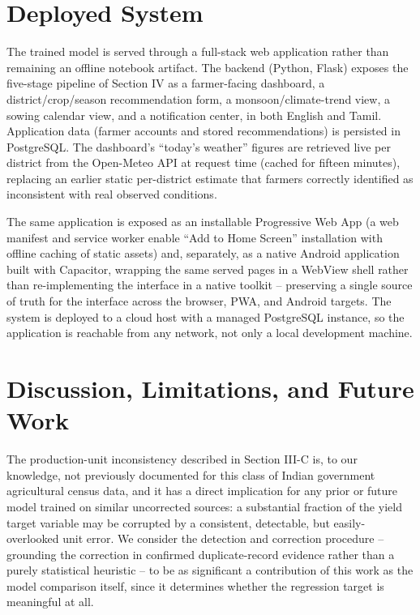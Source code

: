 \documentclass[conference]{IEEEtran}
\begin{document}
\section{Deployed System}

The trained model is served through a full-stack web application rather than remaining
an offline notebook artifact. The backend (Python, Flask) exposes the five-stage
pipeline of Section IV as a farmer-facing dashboard, a district/crop/season
recommendation form, a monsoon/climate-trend view, a sowing calendar view, and a
notification center, in both English and Tamil. Application data (farmer accounts and
stored recommendations) is persisted in PostgreSQL. The dashboard's ``today's
weather'' figures are retrieved live per district from the Open-Meteo API at request
time (cached for fifteen minutes), replacing an earlier static per-district estimate
that farmers correctly identified as inconsistent with real observed conditions.

The same application is exposed as an installable Progressive Web App (a web manifest
and service worker enable ``Add to Home Screen'' installation with offline caching of
static assets) and, separately, as a native Android application built with Capacitor,
wrapping the same served pages in a WebView shell rather than re-implementing the
interface in a native toolkit -- preserving a single source of truth for the
interface across the browser, PWA, and Android targets. The system is deployed to a
cloud host with a managed PostgreSQL instance, so the application is reachable from
any network, not only a local development machine.

\section{Discussion, Limitations, and Future Work}

The production-unit inconsistency described in Section III-C is, to our knowledge, not
previously documented for this class of Indian government agricultural census data,
and it has a direct implication for any prior or future model trained on similar
uncorrected sources: a substantial fraction of the yield target variable may be
corrupted by a consistent, detectable, but easily-overlooked unit error. We consider
the detection and correction procedure -- grounding the correction in confirmed
duplicate-record evidence rather than a purely statistical heuristic -- to be as
significant a contribution of this work as the model comparison itself, since it
determines whether the regression target is meaningful at all.
\end{document}
